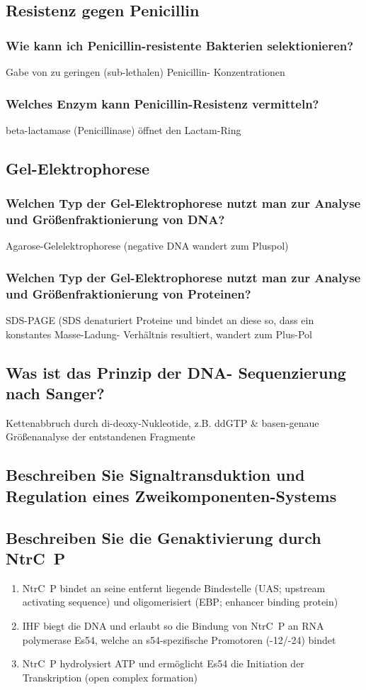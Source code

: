 \documentclass{article}
\begin{document}
\subsection*{Resistenz gegen Penicillin}
\subsubsection*{Wie kann ich Penicillin-resistente Bakterien
selektionieren?}
Gabe von zu geringen (sub-lethalen) Penicillin-
Konzentrationen
\subsubsection*{Welches Enzym kann Penicillin-Resistenz
vermitteln?}
beta-lactamase (Penicillinase) öffnet den Lactam-Ring
\subsection*{Gel-Elektrophorese}
\subsubsection*{Welchen Typ der Gel-Elektrophorese nutzt
man zur Analyse und Größenfraktionierung
von DNA?}
Agarose-Gelelektrophorese (negative DNA
wandert zum Pluspol)
\subsubsection*{Welchen Typ der Gel-Elektrophorese nutzt
man zur Analyse und Größenfraktionierung
von Proteinen?}
SDS-PAGE (SDS denaturiert Proteine und bindet
an diese so, dass ein konstantes Masse-Ladung-
Verhältnis resultiert, wandert zum Plus-Pol
\subsection*{Was ist das Prinzip der DNA-
Sequenzierung nach Sanger?}
Kettenabbruch durch di-deoxy-Nukleotide, z.B. ddGTP
& basen-genaue Größenanalyse der entstandenen Fragmente
\subsection*{Beschreiben Sie Signaltransduktion und
Regulation eines Zweikomponenten-Systems}

\subsection*{Beschreiben Sie die
Genaktivierung durch NtrC~P}
\begin{enumerate}
    \item NtrC~P bindet
an seine entfernt liegende Bindestelle 
(UAS; upstream activating sequence)
und oligomerisiert
(EBP; enhancer binding protein)
\item IHF biegt die DNA und erlaubt so
die Bindung von NtrC~P an
RNA polymerase Es54, welche
an s54-spezifische Promotoren (-12/-24)
bindet
\item NtrC~P hydrolysiert ATP und
ermöglicht Es54 die Initiation der
Transkription (open complex formation)
\end{enumerate}
\end{document}
